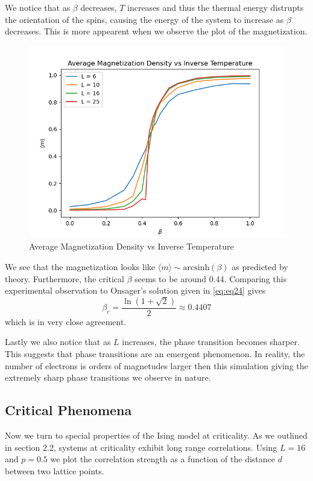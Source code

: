 \documentclass{article}
\begin{document}
We notice that as $\beta$ decreases, $T$ increases and thus the thermal energy distrupts the orientation of the spins, causing
the energy of the system to increase as $\beta$ decreases. This is more appearent when we observe the plot of the magnetization.

\begin{figure}[ht]
    \includegraphics[width=\columnwidth]{plots/avg_mag_vs_beta.png}
    \caption{Average Magnetization Density vs Inverse Temperature}
    \label{fig:4}
\end{figure}

We see that the magnetization looks like $\langle m \rangle \sim \mathrm{arcsinh}(\beta)$ as predicted by theory. 
Furthermore, the critical $\beta$ seems to be around 0.44. Comparing this experimental observation to Onsager's solution given 
in \eqref{eq:eq24} gives 
\begin{equation}
    \beta_c = \frac{\ln(1+\sqrt{2})}{2} \approx 0.4407
\end{equation}
which is in very close agreement. 

Lastly we also notice that as $L$ increases, the phase transition becomes sharper. This suggests that phase transitions are
an emergent phenomenon. In reality, the number of electrons is orders of magnetudes larger then this simulation giving the extremely sharp 
phase transitions we observe in nature.

\subsection{Critical Phenomena}
Now we turn to special properties of the Ising model at criticality. As we outlined in section 2.2, systems at criticality
exhibit long range correlations. Using $L=16$ and $p=0.5$ we plot the correlation strength as a function of the distance $d$ between
two lattice points. 
\end{document}
